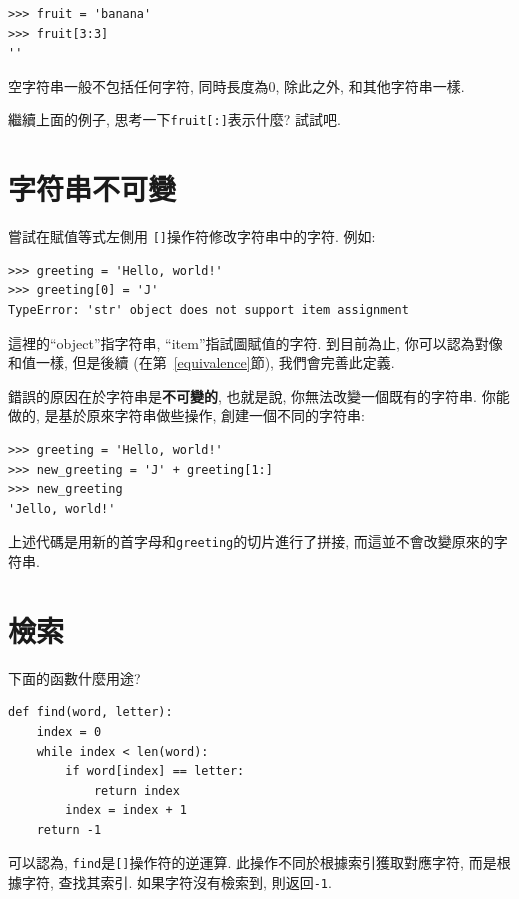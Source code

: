 \documentclass[10pt]{book}
\begin{document}
\begin{verbatim}
>>> fruit = 'banana'
>>> fruit[3:3]
''
\end{verbatim}
%
空字符串一般不包括任何字符, 同時長度為0, 除此之外, 
和其他字符串一樣. 

繼續上面的例子, 思考一下{\tt fruit[:]}表示什麼? 試試吧. 



\section{字符串不可變}

嘗試在賦值等式左側用 {\tt []}操作符修改字符串中的字符. 
例如:

\begin{verbatim}
>>> greeting = 'Hello, world!'
>>> greeting[0] = 'J'
TypeError: 'str' object does not support item assignment
\end{verbatim}
%
這裡的``object''指字符串, ``item''指試圖賦值的字符. 
到目前為止, 你可以認為對像和值一樣, 但是後續
(在第~\ref{equivalence}節), 我們會完善此定義. 

錯誤的原因在於字符串是{\bf 不可變的}, 
也就是說, 你無法改變一個既有的字符串. 
你能做的, 是基於原來字符串做些操作, 創建一個不同的字符串:

\begin{verbatim}
>>> greeting = 'Hello, world!'
>>> new_greeting = 'J' + greeting[1:]
>>> new_greeting
'Jello, world!'
\end{verbatim}
%
上述代碼是用新的首字母和{\tt greeting}的切片進行了拼接, 
而這並不會改變原來的字符串. 


\section{檢索}
\label{find}
下面的函數什麼用途?

\begin{verbatim}
def find(word, letter):
    index = 0
    while index < len(word):
        if word[index] == letter:
            return index
        index = index + 1
    return -1
\end{verbatim}
%
可以認為, {\tt find}是{\tt []}操作符的逆運算. 
此操作不同於根據索引獲取對應字符, 
而是根據字符, 查找其索引. 如果字符沒有檢索到, 
則返回{\tt -1}. 
\end{document}
